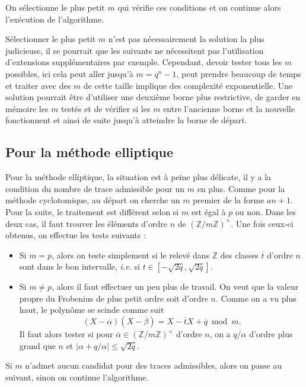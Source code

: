 \documentclass[a4paper]{article} %
\numberwithin{section}{part}
\numberwithin{equation}{section}
\newcommand\zmodninv[1]{(\mathbb{Z}/#1\mathbb{Z})^{\times}}
\newcommand\ZZ{\mathbb{Z}}
\begin{document}
On sélectionne le plus petit $m$ qui vérifie ces conditions et on continue alors
l'exécution de l'algorithme.

\begin{rem}
Sélectionner le plus petit $m$ n'est pas nécessairement la solution la plus
judicieuse, il se pourrait que les suivants ne nécessitent pas l'utilisation
d'extensions supplémentaires par exemple. Cependant, devoir tester tous les $m$
possibles, ici cela peut aller jusqu'à $m = q^n - 1$, peut prendre beaucoup de
temps et traiter avec des $m$ de cette taille implique des complexité
exponentielle. Une solution pourrait être d'utiliser une deuxième borne plus
restrictive, de garder en mémoire les $m$ testés et de vérifier si les $m$ entre
l'ancienne borne et la nouvelle fonctionnent et ainsi de suite jusqu'à atteindre
la borne de départ.
\end{rem}

\subsection{Pour la méthode elliptique}
\label{sec:recherchermell}
Pour la méthode elliptique, la situation est à peine plus délicate, il y a la
condition du nombre de trace admissible pour un $m$ en plus. Comme pour la 
méthode cyclotomique, au départ on cherche un $m$ premier de la forme $an + 1$. 
Pour la suite, le traitement est différent selon si $m$ est égal à $p$ ou non.
Dans les deux cas, il faut trouver les éléments d'ordre $n$ de $\zmodninv{m}$.
Une fois ceux-ci obtenus, on effectue les tests suivants :
\vspace{0.3cm}
\begin{itemize}
    \item Si $m = p$, alors on teste simplement si le relevé dans $\ZZ$ des
    classes $\overline{t}$ d'ordre $n$ sont dans le bon intervalle, 
    \emph{i.e.} si $t\in[-\sqrt{2q},\sqrt{2q}]$.\vspace{0.2cm}

    \item Si $m\neq p$, alors il faut effectuer un peu plus de travail. On
    veut que la valeur propre du Frobenius de plus petit ordre soit d'ordre $n$.
    Comme on a vu plus haut, le polynôme se scinde comme suit 
    \[(X - \overline{\alpha})(X- \overline{\beta})= X -\overline{t}X + 
    \overline{q}\bmod m.\] 
    Il faut alors tester si pour $\overline{\alpha}\in\zmodninv{m}$ 
    d'ordre $n$, on a $\overline{q/\alpha}$ d'ordre plus grand que $n$ et 
    $\vert{\alpha + q/\alpha}\vert\leq\sqrt{2q}$.
\end{itemize}
\vspace{0.3cm}
Si $m$ n'admet aucun candidat pour des traces admissibles, alors on passe
au suivant, sinon on continue l'algorithme.
\end{document}
